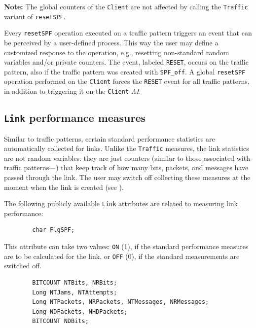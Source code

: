 \medskip

\noindent
{\bf Note:} The global counters of the {\tt Client} are not affected
by calling the {\tt Traffic} variant of {\tt resetSPF}.

\medskip

Every {\tt resetSPF} operation executed on a traffic pattern triggers an event
that can be perceived by a user-defined process.
This way the user may define a customized response to the operation, e.g.,
resetting non-standard random variables and/or private counters.
The event, labeled {\tt RESET}, occurs on the traffic pattern, also if the
traffic pattern was created with {\tt SPF\_off}.
A global {\tt resetSPF} operation performed on the {\tt Client} forces the
{\tt RESET} event for all traffic patterns, in addition to triggering it
on the {\tt Client} {\em AI}.

\subsection{{\tt Link} performance measures}
\label{rm_pm_lk}

Similar to traffic patterns, certain standard performance statistics
are automatically collected for links.
Unlike the {\tt Traffic} measures, the link statistics are not random
variables: they are just counters (similar to those associated with
traffic patterns---) that keep track of how many bits,
packets, and messages have passed through the link.
The user may switch off collecting these measures at the moment when the
link is created (see ).

The following publicly available {\tt Link} attributes are related to
measuring link performance:
\begin{verbatim}
        char FlgSPF;
\end{verbatim}
This attribute can take two values: {\tt ON} (1), if the standard performance
measures are to be calculated for the link, or {\tt OFF} (0), if the
standard measurements are switched off.

\begin{verbatim}
        BITCOUNT NTBits, NRBits;
        Long NTJams, NTAttempts;
        Long NTPackets, NRPackets, NTMessages, NRMessages;
        Long NDPackets, NHDPackets;
        BITCOUNT NDBits;
\end{verbatim}

